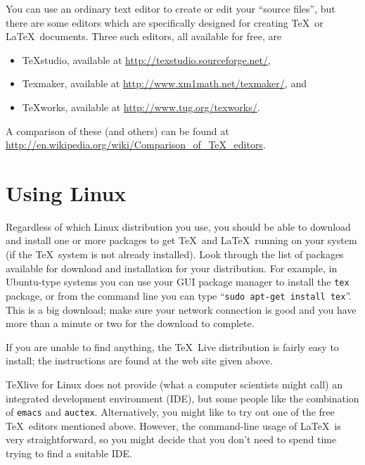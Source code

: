 You can use an ordinary text editor to create or edit your ``source
files'', but there are some editors which are specifically designed
for creating \TeX\ or \LaTeX\ documents.  Three such editors, all
available for free, are
\begin{itemize} \itemsep0pt
\item \TeX{}studio, available at
\url{http://texstudio.sourceforge.net/},
\item Texmaker,
available at \url{http://www.xm1math.net/texmaker/}, and
\item \TeX{}works, available at \url{http://www.tug.org/texworks/}.
\end{itemize}
A comparison of these (and others) can be found at
\url{http://en.wikipedia.org/wiki/Comparison_of_TeX_editors}.

\section{Using Linux}


Regardless of which Linux distribution you use, you should be able to
download and install one or more packages to get \TeX\ and
\LaTeX\ running on your system (if the \TeX\ system is not already
installed).  Look through the list of packages available for download
and installation for your distribution.  For example, in Ubuntu-type
systems you can use your GUI package manager to install the \verb|tex|
package, or from the command line you can type
``\verb|sudo apt-get install tex|''.  This is a big download; make
sure your network connection is good and you have more than a minute
or two for the download to complete.

If you are unable to find anything, the \TeX\ Live distribution is
fairly easy to install; the instructions are found at the web site
given above.

\TeX{}live for Linux does not provide (what a computer scientists
might call) an integrated development environment (IDE), but some
people like the combination of \verb|emacs| and \verb|auctex|.
Alternatively, you might like to try out one of the free \TeX\ editors
mentioned above.  However, the command-line usage of \LaTeX\ is very
straightforward, so you might decide that you don't need to spend time
trying to find a suitable IDE.

